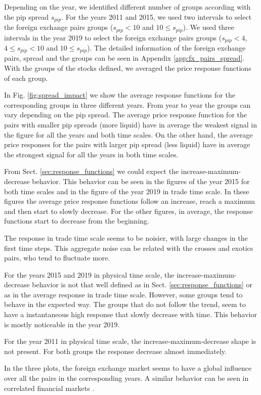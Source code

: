 Depending on the year, we identified different number of groups according with
the pip spread $s_{pip}$. For the years 2011 and 2015, we used two intervals to
select the foreign exchange pairs groups ($s_{pip}<10$ and $10 \le s_{pip}$).
We used three intervals in the year 2019 to select the foreign exchange pairs
groups ($s_{pip}<4$, $4 \le s_{pip} < 10$ and $10 \le s_{pip}$). The detailed
information of the foreign exchange pairs, spread and the groups can be seen in
Appendix \ref{app:fx_pairs_spread}. With the groups of the stocks defined, we
averaged the price response functions of each group.

In Fig. \ref{fig:spread_impact} we show the average response functions for
the corresponding groups in three different years. From year to year the groups
can vary depending on the pip spread. The average price response function for
the pairs with smaller pip spreads (more liquid) have in average the weakest
signal in the figure for all the years and both time scales. On the other hand,
the average price responses for the pairs with larger pip spread (less liquid)
have in average the strongest signal for all the years in both time scales.

From Sect. \ref{sec:response_functions} we could expect the
increase-maximum-decrease behavior. This behavior can be seen in the figures of
the year 2015 for both time scales and in the figure of the year 2019 in trade
time scale. In these figures the average price response functions follow an
increase, reach a maximum and then start to slowly decrease. For the other
figures, in average, the response functions start to decrease from the
beginning.

The response in trade time scale seems to be noisier, with large changes in the
first time steps. This aggregate noise can be related with the crosses and
exotics pairs, who tend to fluctuate more.

For the years 2015 and 2019 in physical time scale, the
increase-maximum-decrease behavior is not that well defined as in Sect.
\ref{sec:response_functions} or as in the average response in trade time scale.
However, some groups tend to behave in the expected way. The groups that do not
follow the trend, seem to have a instantaneous high response that slowly
decrease with time. This behavior is mostly noticeable in the year 2019.

For the year 2011 in physical time scale, the increase-maximum-decrease shape
is not present. For both groups the response decrease almost immediately.

In the three plots, the foreign exchange market seems to have a global
influence over all the pairs in the corresponding years. A similar behavior
can be seen in correlated financial markets \cite{my_paper_response_financial}.
